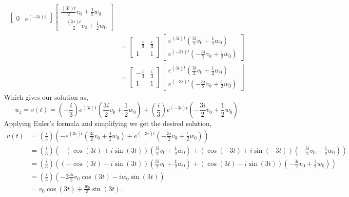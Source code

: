 \documentclass[12pt]{article}
\makeatletter
\theoremstyle{homework}
\newenvironment{exercise}[1]
{\def\@currentlabel{#1}\exercisecore}
{\endexercisecore}
\makeatother
\begin{document}
\begin{exercise}{Problem P26}
\begin{align*}
\begin{bmatrix}
      0 & e^{(-3i)t}
    \end{bmatrix}
    \begin{bmatrix}
      \frac{(3i)t}{2}v_0 + \frac{1}{2}w_0\\
      -\frac{(3i)t}{2}v_0 + \frac{1}{2}w_0
    \end{bmatrix}\\
    &= \begin{bmatrix}
      -\frac{i}{3} & \frac{i}{3}\\
      1 & 1
    \end{bmatrix}
    \begin{bmatrix}
      e^{(3i)t}(\frac{3i}{2}v_0 + \frac{1}{2}w_0)\\
      e^{(-3i)t}(-\frac{3i}{2}v_0 + \frac{1}{2}w_0)
    \end{bmatrix}\\
    &= \begin{bmatrix}
      -\frac{i}{3} & \frac{i}{3}\\
      1 & 1
    \end{bmatrix}
    \begin{bmatrix}
      e^{(3i)t}(\frac{3i}{2}v_0 + \frac{1}{2}w_0)\\
      e^{(-3i)t}(-\frac{3i}{2}v_0 + \frac{1}{2}w_0)
    \end{bmatrix}
  \end{align*}
  Which gives our solution as, 
  \begin{equation*}
    u_1 = v(t) = \left(-\frac{i}{3}\right)e^{(3i)t}\left(\frac{3i}{2}v_0 + \frac{1}{2}w_0\right) + \left(\frac{i}{3}\right)e^{(-3i)t}\left(-\frac{3i}{2}v_0 + \frac{1}{2}w_0\right)
  \end{equation*}
  Applying Euler's formula and simplifying we get the desired solution, 
  \begin{align*}
    v(t) &= \left(\frac{i}{3}\right)\left(-e^{(3i)t}\left(\frac{3i}{2}v_0 + \frac{1}{2}w_0\right) + e^{(-3i)t}\left(-\frac{3i}{2}v_0 + \frac{1}{2}w_0\right)\right)\\
    &= \left(\frac{i}{3}\right)\left(-(\cos(3t) + i\sin(3t))\left(\frac{3i}{2}v_0 + \frac{1}{2}w_0\right) + (\cos(-3t) + i\sin(-3t))\left(-\frac{3i}{2}v_0 + \frac{1}{2}w_0\right)\right)\\
    &= \left(\frac{i}{3}\right)\left((-\cos(3t) - i\sin(3t))\left(\frac{3i}{2}v_0 + \frac{1}{2}w_0\right) + (\cos(3t) - i\sin(3t))\left(-\frac{3i}{2}v_0 + \frac{1}{2}w_0\right)\right)\\
    &= \left(\frac{i}{3}\right)\left(-2\frac{3i}{2}v_0\cos(3t) - iw_0\sin(3t)\right)\\
    &= v_0\cos(3t) + \frac{w_0}{3}\sin(3t).
  \end{align*}




  
\end{exercise}
\end{document}
